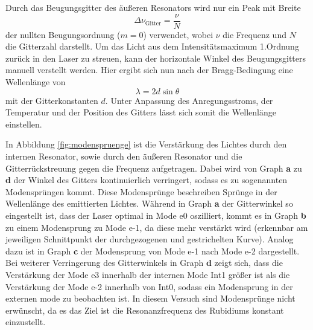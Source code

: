 Durch das Beugungsgitter des äußeren Resonators wird nur ein Peak mit Breite
\begin{equation}
  \Delta\nu_{\text{Gitter}} = \frac{\nu}{N}
\end{equation}
der nullten Beugungsordnung ($m=\num{0}$) verwendet, wobei $\nu$ die Frequenz
und $N$ die Gitterzahl darstellt. Um das Licht aus dem Intensitätsmaximum 1.Ordnung
zurück in den Laser zu streuen, kann der horizontale Winkel \theta des Beugungsgitters
manuell verstellt werden. Hier ergibt sich nun nach der Bragg-Bedingung eine
Wellenlänge von
\begin{equation}
    \lambda = 2d\sin{\theta}
\end{equation}
mit der Gitterkonstanten $d$.
Unter Anpassung des Anregungsstroms, der Temperatur und der Position des Gitters
lässt sich somit die Wellenlänge einstellen.


In Abbildung \ref{fig:modenspruenge} ist die Verstärkung des Lichtes durch den internen
Resonator, sowie durch den äußeren Resonator und die Gitterrückstreuung gegen
die Frequenz aufgetragen.
Dabei wird von Graph \textbf{a} zu \textbf{d} der Winkel des Gitters kontinuierlich verringert,
sodass es zu sogenannten Modensprüngen kommt.
Diese Modensprünge beschreiben Sprünge in der Wellenlänge des emittierten Lichtes.
Während in Graph \textbf{a} der Gitterwinkel so eingestellt ist, dass der Laser optimal in
Mode e0 oszilliert, kommt es in Graph \textbf{b} zu einem Modensprung zu Mode e-1,
da diese mehr verstärkt wird (erkennbar am jeweiligen Schnittpunkt der durchgezogenen und
gestrichelten Kurve).
Analog dazu ist in Graph \textbf{c} der Modensprung von Mode e-1 nach Mode e-2
dargestellt.
Bei weiterer Verringerung des Gitterwinkels in Graph \textbf{d} zeigt sich,
dass die Verstärkung der Mode e3 innerhalb der internen Mode Int1 größer ist
als die Verstärkung der Mode e-2 innerhalb von Int0, sodass ein Modensprung
in der externen mode zu beobachten ist. In diesem Versuch sind Modensprünge
nicht erwünscht, da es das Ziel ist die Resonanzfrequenz des Rubidiums konstant
einzustellt.


